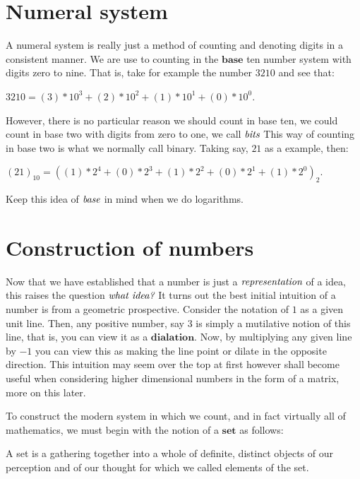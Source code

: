 \section{Numeral system} %
\label{subsec:numeralsystem}
A numeral system is really just a method of counting and denoting digits in a consistent manner. We are use to counting
in the $\textbf{base}$ ten number system with digits zero to nine. That is, take for example the number $3210$ and see that:
\begin{exmp}
 $3210 = (3)*10^3 + (2)*10^2 + (1)*10^1 + (0)*10^0$.
\end{exmp}
However, there is no particular reason we should count in base ten, we could count in base two with digits from zero to one, we call $\emph{bits}$
This way of counting in base two is what we normally call binary. Taking say, $21$ as a example, then:
\begin{exmp}
 $(21)_{10} = \left( (1)*2^4 + (0)*2^3 + (1)*2^2 + (0)*2^1 + (1)*2^0 \right)_{2}$.
\end{exmp}

Keep this idea of $\emph{base}$ in mind when we do logarithms.

\section{Construction of numbers} %
\label{subsec:numberconstruction}
Now that we have established that a number is just a $\emph{representation}$ of a idea, this raises the question $\emph{what idea?}$
It turns out the best initial intuition of a number is from a geometric prospective. Consider the notation of $1$ as a given unit line.
Then, any positive number, say $3$ is simply a mutilative notion of this line, that is, you can view it as a $\textbf{dialation}$. Now,
by multiplying any given line by $-1$ you can view this as making the line point or dilate in the opposite direction. This intuition
may seem over the top at first however shall become useful when considering higher dimensional numbers in the form of a matrix, more on
this later.

To construct the modern system in which we count, and in fact virtually all of mathematics, we must begin with the notion of a $\textbf{set}$ as follows:
\begin{defn}
 A set is a gathering together into a whole of definite, distinct objects of our perception and of our thought for which we called elements of the set.
\end{defn}

